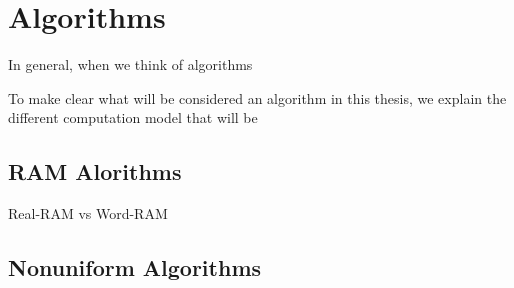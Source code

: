 \chapter{Algorithms}

In general, when we think of algorithms 



To make clear what will be considered an algorithm in this thesis, we explain
the different computation model that will be

\section{RAM Alorithms}

Real-RAM vs Word-RAM

\section{Nonuniform Algorithms}






